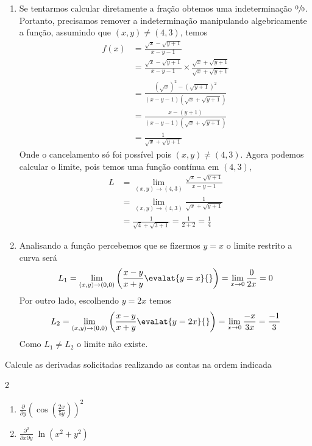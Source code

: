 \documentclass[a4paper,12pt,fleqn]{article}
\newcommand{\D}[2]{\frac{\partial {#1}}{\partial {#2}}}
\newcommand{\DM}[3]{\frac{\partial^2 {#1}}{\partial {#2} \partial {#3}}}
\begin{document}
\begin{answer}
  \vspace{-1,5\baselineskip}
  \begin{enumerate}
    \item[a)]
    Se tentarmos calcular diretamente a fração obtemos uma
    indeterminação $\sfrac{0}{0}$.
    Portanto, precisamos remover a indeterminação manipulando
    algebricamente a função,
    assumindo que $(x, y)\neq(4, 3)$, temos
    \begin{align*}
      f(x) & = \frac{\sqrt{x}-\sqrt{y+1}}{x-y-1} \\[2mm]
           & = \frac{\sqrt{x}-\sqrt{y+1}}{x-y-1} \times
               \frac{\sqrt{x}+\sqrt{y+1}}{\sqrt{x}+\sqrt{y+1}} \\[2mm]
           & = \frac{\left(\sqrt{x}\right)^2-\left(\sqrt{y+1}\right)^2}
                    {(x-y-1)\left(\sqrt{x}+\sqrt{y+1}\right)} \\[2mm]
           & = \frac{x-(y+1)}{(x-y-1)\left(\sqrt{x}+\sqrt{y+1}\right)}\\[2mm]
           & = \frac{1}{\sqrt{x}+\sqrt{y+1}}
    \end{align*}
    Onde o cancelamento só foi possível pois $(x, y)\neq(4, 3)$.
    Agora podemos calcular o limite, pois temos uma função contínua em $(4, 3)$,
    \begin{align*}
      L & = \lim_{(x, y)\to(4, 3)} \frac{\sqrt{x}-\sqrt{y+1}}{x-y-1} \\[2mm]
        & = \lim_{(x, y)\to(4, 3)} \frac{1}{\sqrt{x}+\sqrt{y+1}}\\[2mm]
        & = \frac{1}{\sqrt{4}+\sqrt{3+1}}
          = \frac{1}{2+2}
          = \frac{1}{4}
    \end{align*}

    \item[b)]
    Analisando a função percebemos que se fizermos $y=x$ o limite restrito
    a curva será
    \[
      L_1
      = \lim_{(x, y)\to(0, 0)} \left(\frac{x-y}{x+y} \evalat{y=x}{}\right)
      = \lim_{x\to 0} \frac{0}{2x} = 0
    \]
    Por outro lado, escolhendo $y=2x$ temos
    \[
      L_2
      = \lim_{(x, y)\to(0, 0)} \left(\frac{x-y}{x+y} \evalat{y=2x}{}\right)
      = \lim_{x\to 0} \frac{-x}{3x}
      = \frac{-1}{3}
    \]
    Como $L_1\neq L_2$ o limite não existe.
  \end{enumerate}
  \clearpage
\end{answer}

Calcule as derivadas solicitadas realizando as contas na ordem indicada
\begin{multicols}{2}
  \begin{enumerate}
    \item[a)] \(\D{}{y}      \left(\cos\left(\frac{2x}{5y}\right)\right)^2\)
    \item[b)] \(\DM{}{x}{y}\;\ln\left(x^2 + y^2\right)\)
  \end{enumerate}
\end{multicols}
\end{document}
